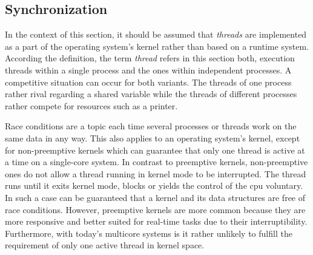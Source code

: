 \subsection{Synchronization}\label{sec:synchro}

In the context of this section, it should be assumed that \textit{threads} are implemented as a part of the operating system's kernel rather than based on a runtime system.
According the definition, the term \textit{thread} refers in this section both, execution threads within a single process and the ones within independent processes.
A competitive situation can occur for both variants. 
The threads of one process rather rival regarding a shared variable while the threads of different processes rather compete for resources such as a printer.

Race conditions are a topic each time several processes or threads work on the same data in any way.
This also applies to an operating system's kernel, except for non-preemptive kernels which can guarantee that only one thread is active at a time on a single-core system\cite{silberschatz2009operating}.
In contrast to preemptive kernels, non-preemptive ones do not allow a thread running in kernel mode to be interrupted. 
The thread runs until it exits kernel mode, blocks or yields the control of the \ac{cpu} voluntary\cite{silberschatz2009operating}.
In such a case can be guaranteed that a kernel and its data structures are free of race conditions.
However, preemptive kernels are more common because they are more responsive and better suited for real-time tasks due to their interruptibility\cite{silberschatz2009operating}.
Furthermore, with today's multicore systems is it rather unlikely to fulfill the requirement of only one active thread in kernel space.

